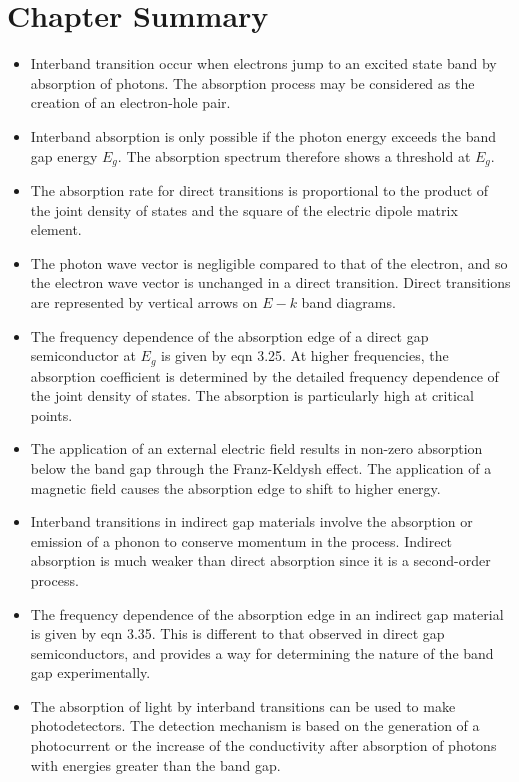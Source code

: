 \documentclass[12pt]{book}
\begin{document}
\section*{Chapter Summary}

\begin{shaded}
\begin{itemize}
  \item Interband transition occur when electrons jump to an excited state band by absorption of photons. The absorption process may be considered as the creation of an electron-hole pair.
  \item Interband absorption is only possible if the photon energy exceeds the band gap energy $E_g$. The absorption spectrum therefore shows a threshold at $E_g$.
  \item The absorption rate for direct transitions is proportional to the product of the joint density of states and the square of the electric dipole matrix element.
  \item The photon wave vector is negligible compared to that of the electron, and so the electron wave vector is unchanged in a direct transition. Direct transitions are represented by vertical arrows on $E-k$ band diagrams.
  \item The frequency dependence of the absorption edge of a direct gap semiconductor at $E_g$ is given by eqn 3.25. At higher frequencies, the absorption coefficient is determined by the detailed frequency dependence of the joint density of states. The absorption is particularly high at critical points.
  \item The application of an external electric field results in non-zero absorption below the band gap through the Franz-Keldysh effect. The application of a magnetic field causes the absorption edge to shift to higher energy.
  \item Interband transitions in indirect gap materials involve the absorption or emission of a phonon to conserve momentum in the process. Indirect absorption is much weaker than direct absorption since it is a second-order process.
  \item The frequency dependence of the absorption edge in an indirect gap material is given by eqn 3.35. This is different to that observed in direct gap semiconductors, and provides a way for determining the nature of the band gap experimentally.
  \item The absorption of light by interband transitions can be used to make photodetectors. The detection mechanism is based on the generation of a photocurrent or the increase of the conductivity after absorption of photons with energies greater than the band gap.
\end{itemize}
\end{shaded}
\end{document}

